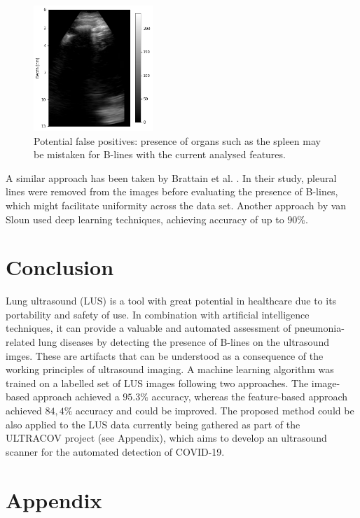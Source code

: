 \documentclass[12pt]{article} %
\begin{document}
	
\begin{figure}[h]
\centering
\includegraphics[width=0.4\textwidth]{figuras/spleen.png}
\caption{Potential false positives: presence of organs such as the spleen may be mistaken for B-lines with the current analysed features.}
\label{spleen}
\end{figure}
	
	
	A similar approach has been taken by Brattain et al. \cite{brattain}. In their study, pleural lines were removed from the images before evaluating the presence of B-lines, which might facilitate uniformity across the data set. Another approach by van Sloun \cite{vanSloun} used deep learning techniques, achieving accuracy of up to $90 \%$.

	
\section{Conclusion}
	Lung ultrasound (LUS) is a tool with great potential in healthcare due to its portability and safety of use. In combination with artificial intelligence techniques, it can provide a valuable and automated assessment of pneumonia-related lung diseases by detecting the presence of B-lines on the ultrasound imges. These are artifacts that can be understood as a consequence of the working principles of ultrasound imaging. A machine learning algorithm was trained on a labelled set of LUS images following two approaches. The image-based approach achieved a $95.3 \%$ accuracy, whereas the feature-based approach achieved $84,4 \%$ accuracy and could be improved. The proposed method could be also applied to the LUS data currently being gathered as part of the ULTRACOV project (see Appendix), which aims to develop an ultrasound scanner for the automated detection of COVID-19.

\section{Appendix}
\end{document}
